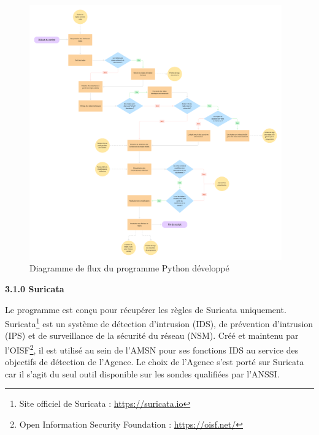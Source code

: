 \begin{figure}[h]%
    \center%
    \includegraphics[width=0.97\textwidth]{assets/diagrameFlux.png}
    \caption[Diagramme de flux du programme Python développé]{Diagramme de flux du programme Python développé}\label{fig:diagrameFlux3-1.}
\end{figure}

\newpage

{\fontsize{15pt}{18pt}\selectfont
    \textbf{3.1.0 Suricata}
}

\vspace{1em}

Le programme est conçu pour récupérer les règles de Suricata uniquement. Suricata\footnote{Site officiel de Suricata : \url{https://suricata.io}} est un système de détection d'intrusion (IDS), de prévention d'intrusion (IPS) et de surveillance de la sécurité du réseau (NSM). Créé et maintenu par l'OISF\footnote{Open Information Security Foundation : \url{https://oisf.net/}}, il est utilisé au sein de l'AMSN pour ses fonctions IDS au service des objectifs de détection de l'Agence. Le choix de l'Agence s'est porté sur Suricata car il s'agit du seul outil disponible sur les sondes qualifiées par l'ANSSI.\\

